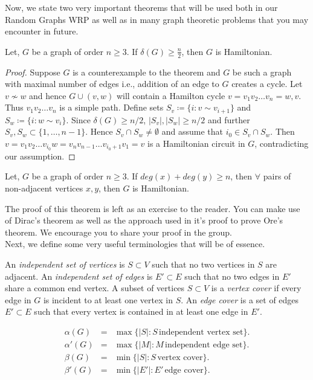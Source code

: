 \documentclass[../basic_graph_theory.tex]{subfiles}
\begin{document}
Now, we state two very important theorems that will be used both in our Random Graphs WRP as well as in many graph theoretic problems that you may encounter in future.

\begin{thm}
    Let, $G$ be a graph of order $n \ge 3$. If $\delta(G) \ge \frac{n}{2}$, then $G$ is Hamiltonian.
\end{thm}
\begin{proof}
    Suppose $G$ is a counterexample to the theorem and $G$ be such a graph with maximal number of edges i.e., addition of an edge to $G$ creates a cycle.  Let $v \nsim w$ and hence $G \cup (v,w)$ will contain a Hamilton cycle $v = v_1v_2\ldots v_n=w,v$. Thus $v_1v_2\ldots v_n$ is a simple path. Define sets $S_v \coloneqq \{ i : v \sim v_{i+1} \}$ and $S_w \coloneqq \{ i : w \sim v_i\}$. Since $\delta(G) \geq n/2$, $|S_v|, |S_w| \geq n/2$ and further $S_v, S_w \subset \{1,\ldots,n-1\}$. Hence $S_v \cap S_w \neq \emptyset$ and assume that $i_0 \in S_v \cap S_w$. Then $v = v_1v_2\ldots v_{i_0}w=v_nv_{n-1}\ldots v_{i_0+1}v_1=v$ is a Hamiltonian circuit in $G$, contradicting our assumption.
\end{proof}

\begin{thm}
    Let, $G$ be a graph of order $n \ge 3$. If $deg(x)+deg(y) \ge n$, then $\forall$ pairs of non-adjacent vertices $x,y$, then $G$ is Hamiltonian.
\end{thm}

The proof of this theorem is left as an exercise to the reader. You can make use of Dirac's theorem as well as the approach used in it's proof to prove Ore's theorem. We encourage you to share your proof in the group.\\
Next, we define some very useful terminologies that will be of essence.\\

\begin{defn}  
    An {\em independent set of vertices} is $S \subset V$ such that no two vertices in $S$ are adjacent. An {\em independent set of edges} is $E' \subset E$ such that no two edges in $E'$ share a common end vertex. A subset of vertices $S \subset V$ is a {\em vertex cover} if every edge in $G$ is incident to at least one vertex in $S$. An {\em edge cover} is a set of edges $E' \subset E$ such that every vertex is contained in at least one edge in $E'$.
\end{defn}
\begin{defn}
    \begin{eqnarray*}
        \alpha(G) & = & \max \{|S| : S \, \mbox{independent vertex set} \}. \\
        \alpha'(G) & = & \max \{|M| : M \, \mbox{independent edge set} \}. \\
        \beta(G) & = & \min \{|S| : S \, \mbox{vertex cover} \}.  \\
        \beta'(G) & = & \min \{|E'| : E' \, \mbox{edge cover} \}.
    \end{eqnarray*}
\end{defn}
\end{document}
